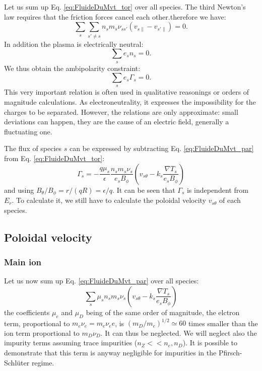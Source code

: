 Let us sum up Eq. \ref{eq:FluideDuMvt_tor} over all species. The third Newton's law requires that the friction forces cancel each other.therefore we have:
\[
		\sum_s \sum_{s'\neq s} n_s m_s \nu_{ss'} \left( v_{s\|}-v_{s'\|} \right) = 0.
\]
In addition the plasma is electrically neutral:
\[
		\sum_s e_s n_s = 0.
\]
We thus obtain the ambipolarity constraint:
\begin{equation}
		\sum_s e_s \Gamma_s = 0.
\end{equation}
This very important relation is often used in qualitative reasonings or orders of magnitude calculations.  As electroneutrality, it expresses the impossibility for the charges to be separated. However, the relations are only approximate: small deviations can happen, they are the cause of an electric field, generally a fluctuating one.

The flux of species $s$ can be expressed by subtracting Eq. \ref{eq:FluideDuMvt_par} from Eq. \ref{eq:FluideDuMvt_tor}:
\begin{equation}
		\Gamma_s = -\frac{q\mu_s}{\epsilon} \frac{n_s m_s \nu_s}{e_s B_\phi} \left( v_{s\theta} - k_s\frac{\nabla T_s}{e_s B_\phi} \right)
		\label{eq:FluxRadialGenerique}
\end{equation}
and using $B_\theta/B_\phi = r/(qR) = \epsilon/q$. It can be seen that $\Gamma_s$  is independent from $E_r$. To calculate it, we still have to calculate the poloidal velocity $v_{s\theta}$ of each species.


						
						
				\subsection{Poloidal velocity}
				\label{sec:VitessePoloidale}

						\subsubsection{Main ion}
						\label{sec:VthetaIonPrincipal}


Let us now sum up Eq. \ref{eq:FluideDuMvt_par} over all species:
\[
		\sum_s \mu_s n_s m_s \nu_s \left( v_{s\theta} - k_s \frac{\nabla T_s}{e_s B_\phi} \right) 
\]
the coefficients $\mu_e$ and $\mu_D$ being of the same order of magnitude, the elctron term, proportional to $m_e \nu_e = m_e \nu_ee$, is $(m_D/m_e)^{1/2} \simeq 60$ times smaller than the ion term proportional to $m_D \nu_D$. It can thus be neglected.
We will neglect also the impurity terms assuming trace impurities ($n_Z << n_e, n_D$). It is possible to demonstrate that this term is anyway negligible for impurities in the Pfirsch-Schlüter regime.


